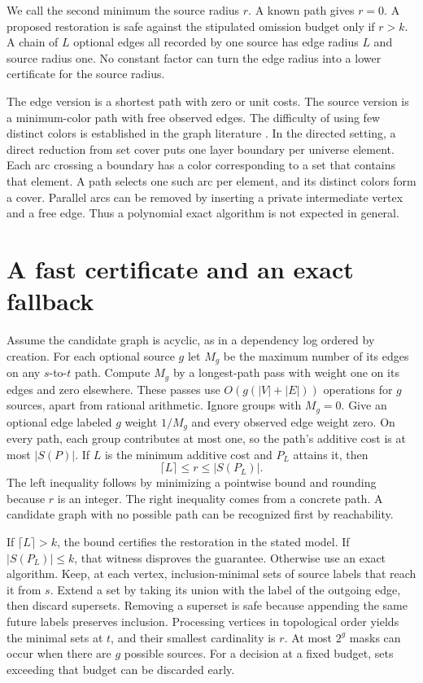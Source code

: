 \documentclass[11pt]{article}
\begin{document}
We call the second minimum the source radius $r$. A known path
gives $r=0$. A proposed restoration is safe against the stipulated
omission budget only if $r>k$. A chain of $L$ optional edges all
recorded by one source has edge radius $L$ and source radius one.
No constant factor can turn the edge radius into a lower
certificate for the source radius.

The edge version is a shortest path with zero or unit costs.
The source version is a minimum-color path with free observed
edges. The difficulty of using few distinct colors is
established in the graph literature \cite{broersma}. In the
directed setting, a direct reduction from set cover puts one
layer boundary per universe element. Each arc crossing a
boundary has a color corresponding to a set that contains that
element. A path selects one such arc per element, and its
distinct colors form a cover. Parallel arcs can be removed by
inserting a private intermediate vertex and a free edge.
Thus a polynomial exact algorithm is not expected in general.

\section{A fast certificate and an exact fallback}
Assume the candidate graph is acyclic, as in a dependency log
ordered by creation. For each optional source $g$ let $M_g$
be the maximum number of its edges on any $s$-to-$t$ path.
Compute $M_g$ by a longest-path pass with weight one on its
edges and zero elsewhere. These passes use $O(g(|V|+|E|))$
operations for $g$ sources, apart from rational arithmetic.
Ignore groups with $M_g=0$.
Give an optional edge labeled $g$ weight $1/M_g$ and every
observed edge weight zero. On every path, each group contributes
at most one, so the path's additive cost is at most $|S(P)|$.
If $L$ is the minimum additive cost and $P_L$ attains it, then
\[
\lceil L\rceil \le r \le |S(P_L)|.
\]
The left inequality follows by minimizing a pointwise bound and
rounding because $r$ is an integer. The right inequality comes
from a concrete path. A candidate graph with no possible path
can be recognized first by reachability.

If $\lceil L\rceil>k$, the bound certifies the restoration in
the stated model. If $|S(P_L)|\le k$, that witness disproves
the guarantee. Otherwise use an exact algorithm. Keep, at
each vertex, inclusion-minimal sets of source labels that reach
it from $s$. Extend a set by taking its union with the label
of the outgoing edge, then discard supersets. Removing a
superset is safe because appending the same future labels
preserves inclusion. Processing vertices in topological order
yields the minimal sets at $t$, and their smallest cardinality
is $r$. At most $2^g$ masks can occur when there are $g$ possible
sources. For a decision at a fixed budget, sets exceeding that
budget can be discarded early.
\end{document}
